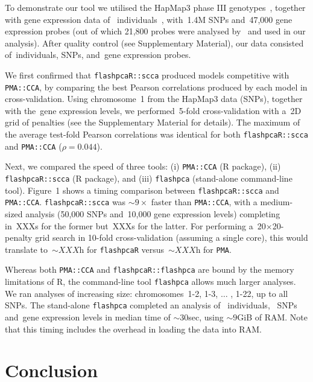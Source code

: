 \documentclass{bioinfo}
\begin{document}
To demonstrate our tool we utilised the HapMap3 phase III
genotypes~\citep{hapmap2010}, together with gene expression data of~\nindiv
individuals~\citep{Stranger2012}, with~1.4M SNPs and~47,000 gene expression
probes (out of which 21,800 probes were analysed by~\citet{Stranger2012} and
used in our analysis). After quality control (see Supplementary Material),
our data consisted of~\nindiv individuals, \nsnps SNPs, and~\ngenes gene
expression probes.

We first confirmed that \texttt{flashpcaR::scca} produced models competitive
with \texttt{PMA::CCA}, by comparing the best Pearson correlations produced
by each model in cross-validation.  Using chromosome~1 from the HapMap3
data (\nsnpschr SNPs), together with the~\ngenes gene expression levels,
we performed~5-fold cross-validation with a~2D grid of penalties (see the
Supplementary Material for details). The maximum of the average test-fold
Pearson correlations was identical for both \texttt{flashpcaR::scca} and
\texttt{PMA::CCA} ($\rho=0.044$).

Next, we compared the speed of three tools: (i) \texttt{PMA::CCA}
(\textsf{R} package), (ii) \texttt{flashpcaR::scca} (\textsf{R}
package), and (iii) \texttt{flashpca} (stand-alone command-line tool).
Figure~1\vphantom{\ref{fig:01}} shows a timing comparison between
\texttt{flashpcaR::scca} and \texttt{PMA::CCA}.  \texttt{flashpcaR::scca} was
${\sim}9\times$ faster than \texttt{PMA::CCA}, with a medium-sized analysis
(50,000 SNPs and~10,000 gene expression levels) completing in~XXXs for the
former but~XXXs for the latter.  For performing a~20${\times}$20-penalty
grid search in 10-fold cross-validation (assuming a single core), this
would translate to~${\sim}XXX$h for \texttt{flashpcaR} versus~${\sim}XXX$h
for \texttt{PMA}.

Whereas both \texttt{PMA::CCA} and \texttt{flashpcaR::flashpca}
are bound by the memory limitations of \textsf{R}, the command-line
tool \texttt{flashpca} allows much larger analyses. We ran analyses of
increasing size: chromosomes~1-2, 1-3, $\hdots$ , 1-22, up to all~\nsnps
SNPs. The stand-alone \texttt{flashpca} completed an analysis of~\nindiv
individuals, ~\nsnps SNPs and~\ngenes gene expression levels in median time
of ${\sim}30$sec, using ${\sim}9$GiB of RAM. Note that this timing includes
the overhead in loading the data into RAM.

\vspace*{-12pt}
\section{Conclusion}
\end{document}
